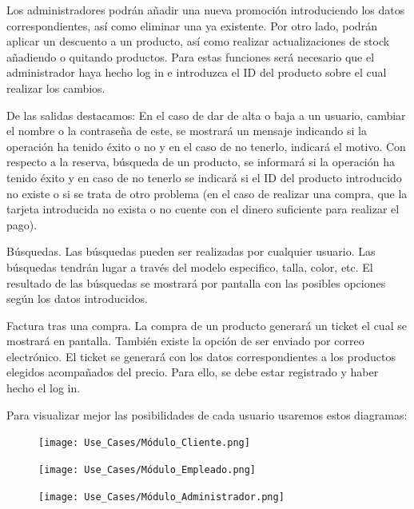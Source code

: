 Los administradores podrán añadir una nueva promoción introduciendo los datos correspondientes, así como eliminar una ya existente. Por otro lado, podrán aplicar un descuento a un producto, así como realizar actualizaciones de stock añadiendo o quitando productos. Para estas funciones será necesario que el administrador haya hecho log in e introduzca el ID del producto sobre el cual realizar los cambios.\vspace{5mm}

De las salidas destacamos:\vspace{5mm}
En el caso de dar de alta o baja a un usuario, cambiar el nombre o la contraseña de este, se mostrará un mensaje indicando si la operación ha tenido éxito o no y en el caso de no tenerlo, indicará el motivo.\vspace{5mm}
Con respecto a la reserva, búsqueda de un producto, se informará si la operación ha tenido éxito y en caso de no tenerlo se indicará si el ID del producto introducido no existe o si se trata de otro problema (en el caso de realizar una compra, que la tarjeta introducida no exista o no cuente con el dinero suficiente para realizar el pago).\vspace{5mm}

Búsquedas. Las búsquedas pueden ser realizadas por cualquier usuario. Las búsquedas tendrán lugar a través del modelo especifico, talla, color, etc. El resultado de las búsquedas se mostrará por pantalla con las posibles opciones según los datos introducidos.\vspace{5mm}

Factura tras una compra. La compra de un producto generará un ticket el cual se mostrará en pantalla. También existe la opción de ser enviado por correo electrónico. El ticket se generará con los datos correspondientes a los productos elegidos acompañados del precio. Para ello, se debe estar registrado y haber hecho el log in.

Para visualizar mejor las posibilidades de cada usuario usaremos estos diagramas:
\begin{figure}[H]
    \centering
    \texttt{[image: Use\_Cases/Módulo\_Cliente.png]}
\end{figure}

\begin{figure}[H]
    \centering
    \texttt{[image: Use\_Cases/Módulo\_Empleado.png]}
\end{figure}
\begin{figure}[H]
    \centering
    \texttt{[image: Use\_Cases/Módulo\_Administrador.png]}
\end{figure}


